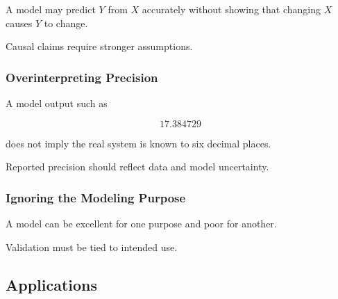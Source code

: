 A model may predict \(Y\) from \(X\) accurately without showing that changing
\(X\) causes \(Y\) to change.

Causal claims require stronger assumptions.

\subsubsection{Overinterpreting Precision}

A model output such as

\[
17.384729
\]

does not imply the real system is known to six decimal places.

Reported precision should reflect data and model uncertainty.

\subsubsection{Ignoring the Modeling Purpose}

A model can be excellent for one purpose and poor for another.

Validation must be tied to intended use.

\subsection{Applications}
\label{subsec:mathematical-modeling-applications}

